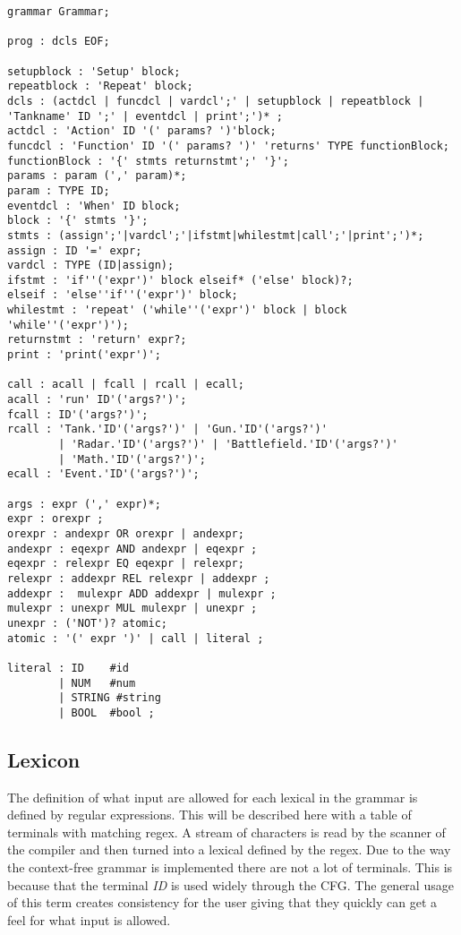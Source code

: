 \begin{lstlisting}[style=MyLang]
grammar Grammar;

prog : dcls EOF;

setupblock : 'Setup' block;
repeatblock : 'Repeat' block;
dcls : (actdcl | funcdcl | vardcl';' | setupblock | repeatblock | 'Tankname' ID ';' | eventdcl | print';')* ;
actdcl : 'Action' ID '(' params? ')'block;
funcdcl : 'Function' ID '(' params? ')' 'returns' TYPE functionBlock;
functionBlock : '{' stmts returnstmt';' '}';
params : param (',' param)*;
param : TYPE ID;
eventdcl : 'When' ID block;
block : '{' stmts '}';
stmts : (assign';'|vardcl';'|ifstmt|whilestmt|call';'|print';')*;
assign : ID '=' expr;
vardcl : TYPE (ID|assign);
ifstmt : 'if''('expr')' block elseif* ('else' block)?;
elseif : 'else''if''('expr')' block;
whilestmt : 'repeat' ('while''('expr')' block | block 'while''('expr')');
returnstmt : 'return' expr?;
print : 'print('expr')';

call : acall | fcall | rcall | ecall;
acall : 'run' ID'('args?')';
fcall : ID'('args?')';
rcall : 'Tank.'ID'('args?')' | 'Gun.'ID'('args?')'
        | 'Radar.'ID'('args?')' | 'Battlefield.'ID'('args?')'
        | 'Math.'ID'('args?')';
ecall : 'Event.'ID'('args?')';

args : expr (',' expr)*;
expr : orexpr ;
orexpr : andexpr OR orexpr | andexpr;
andexpr : eqexpr AND andexpr | eqexpr ;
eqexpr : relexpr EQ eqexpr | relexpr;
relexpr : addexpr REL relexpr | addexpr ;
addexpr :  mulexpr ADD addexpr | mulexpr ;
mulexpr : unexpr MUL mulexpr | unexpr ;
unexpr : ('NOT')? atomic;
atomic : '(' expr ')' | call | literal ;

literal : ID    #id
        | NUM   #num
        | STRING #string
        | BOOL  #bool ;
\end{lstlisting}


\subsection{Lexicon}
The definition of what input are allowed for each lexical in the grammar is defined by regular expressions. This will be described here with a table of terminals with matching regex. A stream of characters is read by the scanner of the compiler and then turned into a lexical defined by the regex.
Due to the way the context-free grammar is implemented there are not a lot of terminals. This is because that the terminal \emph{ID} is used widely through the CFG. The general usage of this term creates consistency for the user giving that they quickly can get a feel for what input is allowed. 

